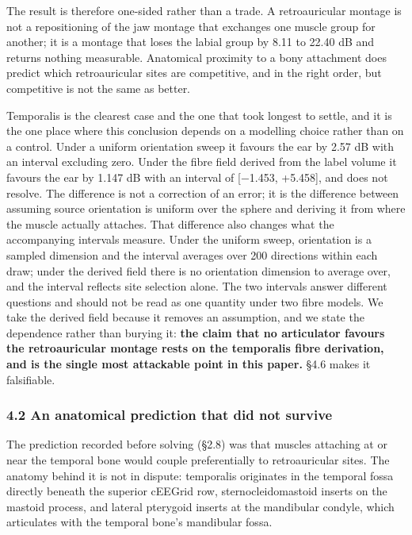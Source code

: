 \documentclass[
  11pt,
]{article}
\begin{document}
The result is therefore one-sided rather than a trade. A retroauricular montage
is not a repositioning of the jaw montage that exchanges one muscle group for
another; it is a montage that loses the labial group by 8.11 to 22.40 dB and
returns nothing measurable. Anatomical proximity to a bony attachment does
predict which retroauricular sites are competitive, and in the right order, but
competitive is not the same as better.

Temporalis is the clearest case and the one that took longest to settle, and it
is the one place where this conclusion depends on a modelling choice rather than
on a control. Under a uniform orientation sweep it favours the ear by 2.57 dB
with an interval excluding zero. Under the fibre field derived from the label
volume it favours the ear by 1.147 dB with an interval of {[}−1.453, +5.458{]}, and
does not resolve. The difference is not a correction of an error; it is the
difference between assuming source orientation is uniform over the sphere and
deriving it from where the muscle actually attaches. That difference also changes
what the accompanying intervals measure. Under the uniform sweep, orientation is
a sampled dimension and the interval averages over 200 directions within each
draw; under the derived field there is no orientation dimension to average over,
and the interval reflects site selection alone. The two intervals answer
different questions and should not be read as one quantity under two fibre
models. We take the derived field
because it removes an assumption, and we state the dependence rather than burying
it: \textbf{the claim that no articulator favours the retroauricular montage rests on
the temporalis fibre derivation, and is the single most attackable point in this
paper.} §4.6 makes it falsifiable.

\subsubsection{4.2 An anatomical prediction that did not survive}\label{an-anatomical-prediction-that-did-not-survive}

The prediction recorded before solving (§2.8) was that muscles attaching at or
near the temporal bone would couple preferentially to retroauricular sites.
The anatomy behind it is not in dispute: temporalis originates in the temporal
fossa directly beneath the superior cEEGrid row, sternocleidomastoid inserts on
the mastoid process, and lateral pterygoid inserts at the mandibular condyle,
which articulates with the temporal bone's mandibular fossa.
\end{document}
